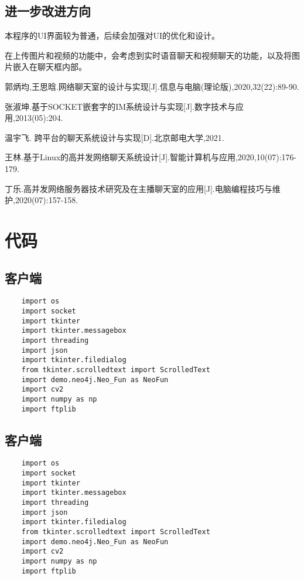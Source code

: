 \documentclass[forprint]{OSPaper}
\begin{document}
\section{进一步改进方向}

本程序的UI界面较为普通，后续会加强对UI的优化和设计。

在上传图片和视频的功能中，会考虑到实时语音聊天和视频聊天的功能，以及将图片嵌入在聊天框内部。

\clearpage
\cleardoublepage{}
{}
\begin{thebibliography}{99}

   郭炳均,王思晗.网络聊天室的设计与实现[J].信息与电脑(理论版),2020,32(22):89-90.

   张淑坤.基于SOCKET嵌套字的IM系统设计与实现[J].数字技术与应用,2013(05):204.
  
  温宇飞. 跨平台的聊天系统设计与实现[D].北京邮电大学,2021.
  
  王林.基于Linux的高并发网络聊天系统设计[J].智能计算机与应用,2020,10(07):176-179.
  
  丁乐.高并发网络服务器技术研究及在主播聊天室的应用[J].电脑编程技巧与维护,2020(07):157-158.
\end{thebibliography}

\clearpage
\appendix


\chapter{代码}

\section{客户端}

\begin{lstlisting}
	import os
	import socket
	import tkinter
	import tkinter.messagebox
	import threading
	import json
	import tkinter.filedialog
	from tkinter.scrolledtext import ScrolledText
	import demo.neo4j.Neo_Fun as NeoFun
	import cv2
	import numpy as np
	import ftplib
\end{lstlisting}

\section{客户端}
\begin{lstlisting}
	import os
	import socket
	import tkinter
	import tkinter.messagebox
	import threading
	import json
	import tkinter.filedialog
	from tkinter.scrolledtext import ScrolledText
	import demo.neo4j.Neo_Fun as NeoFun
	import cv2
	import numpy as np
	import ftplib
\end{lstlisting}
\end{document}
